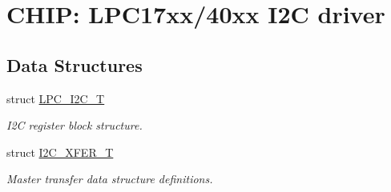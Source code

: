 \hypertarget{group__I2C__17XX__40XX}{\section{C\-H\-I\-P\-: L\-P\-C17xx/40xx I2\-C driver}
\label{group__I2C__17XX__40XX}
}
\subsection*{Data Structures}
\begin{DoxyCompactItemize}
\item 
struct \hyperlink{structLPC__I2C__T}{L\-P\-C\-\_\-\-I2\-C\-\_\-\-T}
\begin{DoxyCompactList}\small\item\em I2\-C register block structure. \end{DoxyCompactList}\item 
struct \hyperlink{structI2C__XFER__T}{I2\-C\-\_\-\-X\-F\-E\-R\-\_\-\-T}
\begin{DoxyCompactList}\small\item\em Master transfer data structure definitions. \end{DoxyCompactList}\end{DoxyCompactItemize}

